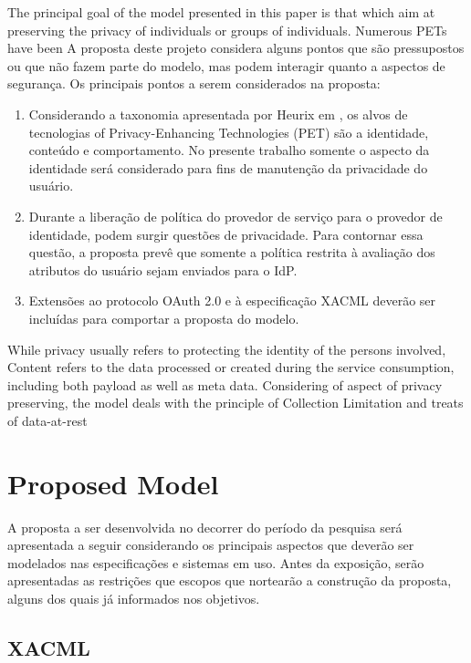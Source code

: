 \documentclass{doublecol-new}
\begin{document}
The principal goal of the model presented in this paper is that which aim at preserving the privacy of individuals or groups of individuals. Numerous PETs have been A proposta deste projeto considera alguns pontos que são pressupostos ou que não fazem parte do modelo, mas podem interagir quanto a aspectos de segurança. Os principais pontos a serem considerados na proposta:
\begin{enumerate}
	\item Considerando a taxonomia apresentada por Heurix em \cite{heurix2015taxonomy}, os alvos de tecnologias of Privacy-Enhancing Technologies (PET) são a identidade, conteúdo e comportamento. No presente trabalho somente o aspecto da identidade será considerado para fins de manutenção da privacidade do usuário.
	\item Durante a liberação de política do provedor de serviço para o provedor de identidade, podem surgir questões de privacidade. Para contornar essa questão, a proposta prevê que somente a política restrita à avaliação dos atributos do usuário sejam enviados para o IdP.
	\item Extensões ao protocolo OAuth 2.0 e à especificação XACML deverão ser incluídas para comportar a proposta do modelo.
\end{enumerate}

While privacy usually refers to protecting the identity of the persons involved, Content refers to the data processed or created during the service consumption, including both payload as well as meta data. \citep{heurix2015taxonomy}
Considering of aspect of privacy preserving, the model deals with the principle of Collection Limitation \citep{oecd2013guidelinesupdated} and treats of data-at-rest \citep{liu2010data}

\section{Proposed Model}
A proposta a ser desenvolvida no decorrer do período da pesquisa será apresentada a seguir considerando os principais aspectos que deverão ser modelados nas especificações e sistemas em uso. Antes da exposição, serão apresentadas as restrições que escopos que nortearão a construção da proposta, alguns dos quais já informados nos objetivos.

\subsection[sec:xacml]{XACML}
\end{document}
